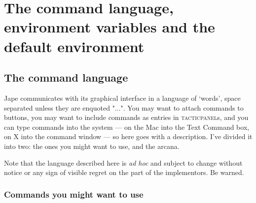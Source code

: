 \chapter{The command language, environment variables and the default environment}
\label{appx:GUIlang}


\section{The command language}


Jape communicates with its graphical interface in a language of `words', space separated unless they are enquoted "...". You may want to attach commands to buttons, you may want to include commands as entries in \textsc{tacticpanel}s, and you can type commands into the system --- on the Mac into the Text Command box, on X into the command window --- so here goes with a description. I've divided it into two: the ones you might want to use, and the arcana.


Note that the language described here is \textit{ad hoc} and subject to change without notice or any sign of visible regret on the part of the implementors. Be warned.


\subsection{Commands you might want to use}


